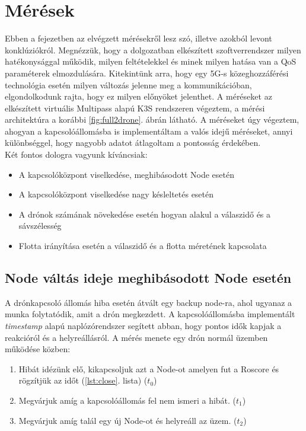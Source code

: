\chapter{Mérések}

Ebben a fejezetben az elvégzett mérésekről lesz szó, illetve azokból levont konklúziókról. Megnézzük, hogy a dolgozatban elkészített szoftverrendszer milyen hatékonysággal működik, milyen feltételekkel és minek milyen hatása van a QoS paraméterek elmozdulására. Kitekintünk arra, hogy egy 5G-s közeghozzáférési technológia esetén milyen változás jelenne meg a kommunikációban, elgondolkodunk rajta, hogy ez milyen előnyöket jelenthet. A méréseket az elkészített virtuális Multipass alapú K3S rendszeren végeztem, a mérési architektúra a korábbi \ref{fig:full2drone}. ábrán látható. A méréseket úgy végeztem, ahogyan a kapcsolóállomásba is implementáltam a valós idejű méréseket, annyi különbséggel, hogy nagyobb adatot átlagoltam a pontosság érdekében. \\

\noindent
Két fontos dologra vagyunk kíváncsiak:
\begin{itemize}
	\item A kapcsolóközpont viselkedése, meghibásodott Node esetén
	\item A kapcsolóközpont viselkedése nagy késleltetés esetén
	\item A drónok számának növekedése esetén hogyan alakul a válaszidő és a sávszélesség
	\item Flotta irányítása esetén a válaszidő és a flotta méretének kapcsolata
\end{itemize}

\section{Node váltás ideje meghibásodott Node esetén}
A drónkapcsoló állomás hiba esetén átvált egy backup node-ra, ahol ugyanaz a munka folytatódik, amit a drón megkezdett. A kapcsolóállomásba implementált \emph{timestamp} alapú naplózórendszer segített abban, hogy pontos idők kapjak a reakcióról és a helyreállásról. A mérés menete egy drón normál üzemben működése közben:
\begin{enumerate}
	\item Hibát idézünk elő, kikapcsoljuk azt a Node-ot amelyen fut a Roscore és rögzítjük az időt (\ref{lst:close}. lista) ($t_0$)
	\item Megvárjuk amíg a kapcsolóállomás fel nem ismeri a hibát. ($t_1$)
	\item Megvárjuk amíg talál egy új Node-ot és helyreáll az üzem. ($t_2$)
\end{enumerate}

